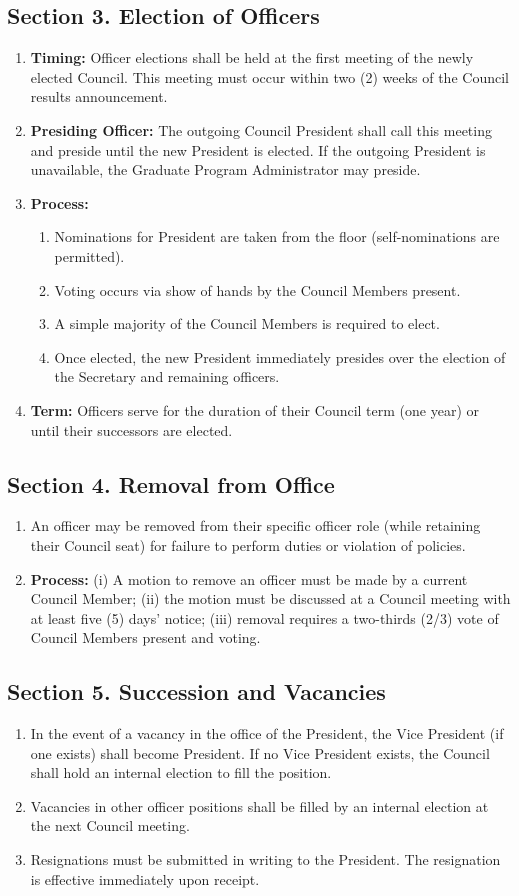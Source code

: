 \documentclass[11pt]{article}
\newcommand{\Sec}[1]{\subsection*{Section {#1}}}
\begin{document}
\Sec{3. Election of Officers}
\begin{enumerate}[label=\alph*)]
    \item \textbf{Timing:} Officer elections shall be held at the first meeting of the newly elected Council. This meeting must occur within two (2) weeks of the Council results announcement.
    
    \item \textbf{Presiding Officer:} The outgoing Council President shall call this meeting and preside until the new President is elected. If the outgoing President is unavailable, the Graduate Program Administrator may preside.

    \item \textbf{Process:}
    \begin{enumerate}[label=(\roman*)]
        \item Nominations for President are taken from the floor (self-nominations are permitted).
        \item Voting occurs via show of hands by the Council Members present.
        \item A simple majority of the Council Members is required to elect.
        \item Once elected, the new President immediately presides over the election of the Secretary and remaining officers.
    \end{enumerate}

    \item \textbf{Term:} Officers serve for the duration of their Council term (one year) or until their successors are elected.
\end{enumerate}

\Sec{4. Removal from Office}
\begin{enumerate}[label=\alph*)]
    \item An officer may be removed from their specific officer role (while retaining their Council seat) for failure to perform duties or violation of policies.
    \item \textbf{Process:} (i) A motion to remove an officer must be made by a current Council Member; (ii) the motion must be discussed at a Council meeting with at least five (5) days' notice; (iii) removal requires a two-thirds (2/3) vote of Council Members present and voting.
\end{enumerate}

\Sec{5. Succession and Vacancies}
\begin{enumerate}[label=\alph*)]
    \item In the event of a vacancy in the office of the President, the Vice President (if one exists) shall become President. If no Vice President exists, the Council shall hold an internal election to fill the position.
    \item Vacancies in other officer positions shall be filled by an internal election at the next Council meeting.
    \item Resignations must be submitted in writing to the President. The resignation is effective immediately upon receipt.
\end{enumerate}
\end{document}
